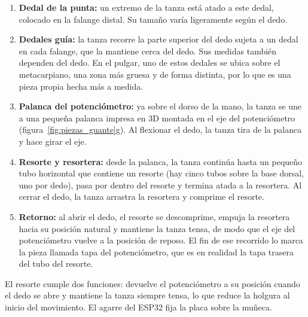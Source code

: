 \begin{enumerate}
    \item \textbf{Dedal de la punta:} un extremo de la tanza está atado a este dedal, colocado en la falange distal. Su tamaño varía ligeramente según el dedo.
    \item \textbf{Dedales guía:} la tanza recorre la parte superior del dedo sujeta a un dedal en cada falange, que la mantiene cerca del dedo. Sus medidas también dependen del dedo. En el pulgar, uno de estos dedales se ubica sobre el metacarpiano, una zona más gruesa y de forma distinta, por lo que es una pieza propia hecha más a medida.
    \item \textbf{Palanca del potenciómetro:} ya sobre el dorso de la mano, la tanza se une a una pequeña palanca impresa en 3D montada en el eje del potenciómetro (figura~\ref{fig:piezas_guante}g). Al flexionar el dedo, la tanza tira de la palanca y hace girar el eje.
    \item \textbf{Resorte y resortera:} desde la palanca, la tanza continúa hasta un pequeño tubo horizontal que contiene un resorte (hay cinco tubos sobre la base dorsal, uno por dedo), pasa por dentro del resorte y termina atada a la resortera. Al cerrar el dedo, la tanza arrastra la resortera y comprime el resorte.
    \item \textbf{Retorno:} al abrir el dedo, el resorte se descomprime, empuja la resortera hacia su posición natural y mantiene la tanza tensa, de modo que el eje del potenciómetro vuelve a la posición de reposo. El fin de ese recorrido lo marca la pieza llamada tapa del potenciómetro, que es en realidad la tapa trasera del tubo del resorte.
\end{enumerate}

El resorte cumple dos funciones: devuelve el potenciómetro a su posición cuando el dedo se abre y mantiene la tanza siempre tensa, lo que reduce la holgura al inicio del movimiento. El agarre del ESP32 fija la placa sobre la muñeca.

